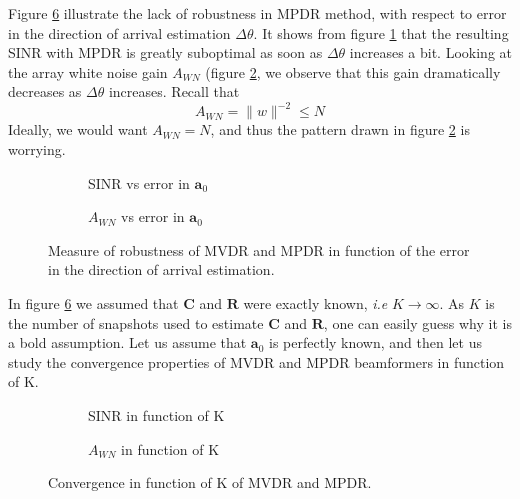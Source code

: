 \documentclass[12pt]{article}
\begin{document}
Figure \ref{fig:mpdr_robust} illustrate the lack of robustness in MPDR method, with respect to error in the direction of arrival estimation $\Delta\theta$. It shows from figure \ref{fig:mpdr_robus_sinr} that the resulting SINR with MPDR is greatly suboptimal as soon as $\Delta\theta$ increases a bit. Looking at the array white noise gain $A_{WN}$ (figure \ref{fig:mpdr_robus_awn}, we observe that this gain dramatically decreases as $\Delta\theta$ increases. Recall that 
\begin{equation}
    A_{WN} = \|w\|^{-2} \leq N
\end{equation}
Ideally, we would want $A_{WN}=N$, and thus the pattern drawn in figure \ref{fig:mpdr_robus_awn} is worrying.
\begin{figure}[H]
    \centering
    \begin{subfigure}[b]{.4\linewidth}
        
        \caption{SINR vs error in $\mathbf{a}_0$}
        \label{fig:mpdr_robus_sinr}
    \end{subfigure}\hspace{0.09\linewidth}
    \begin{subfigure}[b]{.4\linewidth}
        
        \caption{$A_{WN}$ vs error in $\mathbf{a}_0$}
        \label{fig:mpdr_robus_awn}
    \end{subfigure}
    \caption{Measure of robustness of MVDR and MPDR in function of the error in the direction of arrival estimation.}
    \label{fig:mpdr_robust}
\end{figure}
In figure \ref{fig:mpdr_robust} we assumed that $\mathbf{C}$ and $\mathbf{R}$ were exactly known, \textit{i.e} $K\rightarrow\infty$. As $K$ is the number of snapshots used to estimate $\mathbf{C}$ and $\mathbf{R}$, one can easily guess why it is a bold assumption. Let us assume that $\mathbf{a}_0$ is perfectly known, and then let us study the convergence properties of MVDR and MPDR beamformers in function of K.

\begin{figure}[H]
    \centering
    \begin{subfigure}[b]{.4\linewidth}
        
        \caption{SINR in function of K}
        \label{fig:robust_k_sinr}
    \end{subfigure}\hspace{0.09\linewidth}
    \begin{subfigure}[b]{.4\linewidth}
        
        \caption{$A_{WN}$ in function of K}
        \label{fig:robust_k_awn}
    \end{subfigure}
    \caption{Convergence in function of K of MVDR and MPDR.}
    \label{fig:mpdr_robust}
\end{figure}
\end{document}
